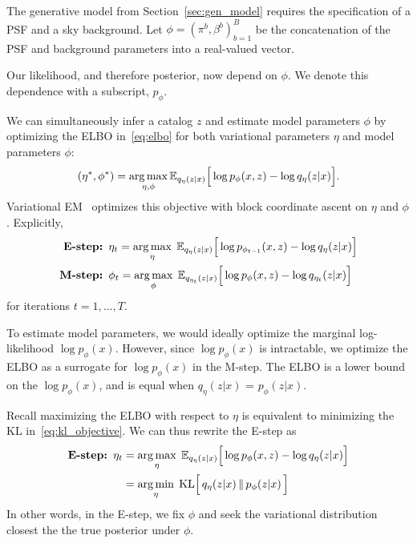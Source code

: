 The generative model from Section~\ref{sec:gen_model} requires
the specification of a PSF and a sky background. Let $\phi = (\pi^b, \beta^b)_{b = 1}^B$ be the concatenation of the PSF and background parameters into a real-valued vector. 

Our likelihood, and therefore posterior, now depend on $\phi$. We denote this dependence with a subscript, $p_\phi$. 

We can simultaneously infer a catalog $z$ and 
estimate model parameters $\phi$ by optimizing 
the ELBO in~\eqref{eq:elbo} for both variational parameters $\eta$ and model parameters $\phi$: 
\begin{align}
(\eta^*, \phi^*) = \operatorname*{arg\,max}_{\eta, \phi} \mathbb{E}_{q_\eta(z | x)}\Big[\log p_\phi(x, z) - \log q_\eta(z | x)\Big].
\label{eq:em_obj}
\end{align}
Variational EM~\cite{Jordan_intro_vi, neal2000varem, Beal2002varem} optimizes this objective with block coordinate ascent on $\eta$ and $\phi$. Explicitly, 
\begin{align}
    \text{{\bf E-step: }} & 
    \eta_{t} = \operatorname*{arg\,max}_{\eta}\; \mathbb{E}_{q_\eta(z | x)}\Big[\log p_{\phi_{t-1}}(x, z) - \log q_\eta(z | x)\Big]
    \label{eq:e_step}
    \\
    \text{{\bf M-step: }} & \phi_{t} = \operatorname*{arg\,max}_{\phi}\; \mathbb{E}_{q_{\eta_t}(z | x)}\Big[\log p_{\phi}(x, z) - \log q_{\eta_t}(z | x)\Big]
    \label{eq:m_step}
\end{align}
for iterations $t = 1, ..., T$. 

To estimate model parameters, we would ideally optimize the marginal log-likelihood $\log p_\phi(x)$. However, since $\log p_\phi(x)$ is intractable, we optimize the ELBO as a surrogate for $\log p_\phi(x)$ in the M-step. The ELBO is a lower bound on the 
$\log p_\phi(x)$, and is equal when $q_\eta(z | x)$ 
= $p_\phi(z | x)$. 

Recall maximizing the ELBO with respect to $\eta$ 
is equivalent to minimizing the KL in~\eqref{eq:kl_objective}.
We can thus rewrite the E-step as 
\begin{align}
    \text{{\bf E-step: }} \eta_{t} &= \operatorname*{arg\,max}_{\eta}\; \mathbb{E}_{q_\eta(z | x)}\Big[\log p_{\phi}(x, z) - \log q_\eta(z | x)\Big] \\
    &= \operatorname*{arg\,min}_{\eta} \; \mathrm{KL}\Big[\,q_\eta(z | x)\, \| \,p_\phi(z | x )\,\Big] \label{eq:e_step_kl}
\end{align} 
In other words, in the E-step, we fix $\phi$ and seek the variational distribution closest the the true posterior under $\phi$. 


